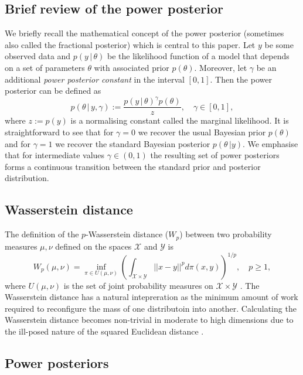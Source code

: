\documentclass[12pt]{article}
\begin{document}
\subsection{Brief review of the power posterior}
We briefly recall the mathematical concept of the power posterior (sometimes
also called the fractional posterior) which is central to this paper. Let $y$
be some observed data and $p(y\, | \, \theta)$ be the likelihood function of a
model that depends on a set of parameters $\theta$ with associated prior
$p(\theta)$. Moreover, let $\gamma$ be an additional \emph{power posterior
constant} in the interval $[0, 1]$. Then the power posterior
\citep{friel2008marginal} can be defined as
\begin{equation}
\label{eq:pow_pos}
p(\theta \, | \, y,\gamma) := \frac{p(y \, | \, \theta)^\gamma p(\theta)}{z}, \quad \gamma \in [0, 1],
\end{equation}
where $z := p(y)$ is a normalising constant called the marginal likelihood. It
is straightforward to see that for $\gamma = 0$ we recover the usual Bayesian
prior $p(\theta)$ and for $\gamma = 1$ we recover the standard Bayesian
posterior $p(\theta \, | y)$. We emphasise that for intermediate values $\gamma
\in (0, 1)$ the resulting set of power posteriors forms a continuous
transition between the standard prior and posterior distribution.

\subsection{Wasserstein distance}
The definition of the $p$-Wasserstein distance ($W_p$) between two probability
measures $\mu, \nu$ defined on the spaces $\mathcal{X}$ and $\mathcal{Y}$ is 
\begin{equation}
W_p(\mu, \nu) = \inf_{\pi \in U(\mu, \nu)} \left(\int_{\mathcal{X} \times \mathcal{Y}}||x-y||^pd\pi(x, y) \right)^{1/p}, \quad p\geq 1,
\label{wasser:ana}
\end{equation}
where $U(\mu, \nu)$ is the set of joint probability measures on
$\mathcal{X}\times \mathcal{Y}$ \citep{villaniOptimalTransportOld2009}. The
Wasserstein distance has a natural intepreration as the minimum amount of work
required to reconfigure the mass of one distributoin into another. Calculating
the Wasserstein distance becomes non-trivial in moderate to high dimensions due
to the ill-posed nature of the squared Euclidean distance
\citep{cuturiMongeBregmanOccam2023}. 

\subsection{Power posteriors}
\end{document}
